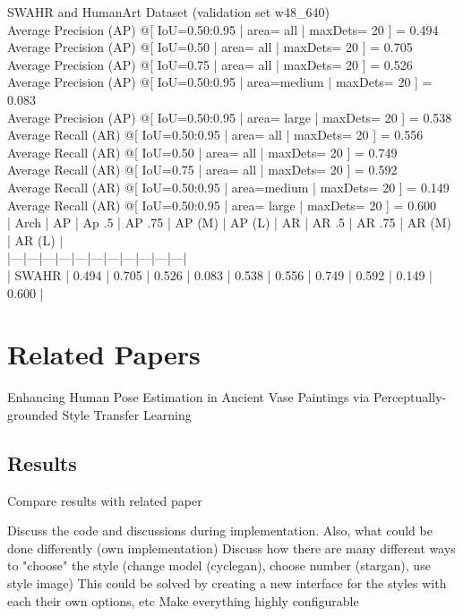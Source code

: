 SWAHR and HumanArt Dataset (validation set w48\_640)\\
Average Precision  (AP) @[ IoU=0.50:0.95 | area=   all | maxDets= 20 ] = 0.494\\
Average Precision  (AP) @[ IoU=0.50      | area=   all | maxDets= 20 ] = 0.705\\
Average Precision  (AP) @[ IoU=0.75      | area=   all | maxDets= 20 ] = 0.526\\
Average Precision  (AP) @[ IoU=0.50:0.95 | area=medium | maxDets= 20 ] = 0.083\\
Average Precision  (AP) @[ IoU=0.50:0.95 | area= large | maxDets= 20 ] = 0.538\\
Average Recall     (AR) @[ IoU=0.50:0.95 | area=   all | maxDets= 20 ] = 0.556\\
Average Recall     (AR) @[ IoU=0.50      | area=   all | maxDets= 20 ] = 0.749\\
Average Recall     (AR) @[ IoU=0.75      | area=   all | maxDets= 20 ] = 0.592\\
Average Recall     (AR) @[ IoU=0.50:0.95 | area=medium | maxDets= 20 ] = 0.149\\
Average Recall     (AR) @[ IoU=0.50:0.95 | area= large | maxDets= 20 ] = 0.600\\
| Arch | AP | Ap .5 | AP .75 | AP (M) | AP (L) | AR | AR .5 | AR .75 | AR (M) | AR (L) |\\
|---|---|---|---|---|---|---|---|---|---|---|\\
| SWAHR | 0.494 | 0.705 | 0.526 | 0.083 | 0.538 | 0.556 | 0.749 | 0.592 | 0.149 | 0.600 |\\

\section{Related Papers}
Enhancing Human Pose Estimation in Ancient Vase Paintings via Perceptually-grounded Style Transfer Learning \cite{Madhu2020}\\
\subsection{Results}
\label{sec:baseline_related_papers_results}
Compare results with related paper

Discuss the code and discussions during implementation.
Also, what could be done differently (own implementation)
Discuss how there are many different ways to "choose" the style (change model (cyclegan), choose number (stargan), use style image)
This could be solved by creating a new interface for the styles with each their own options, etc 
Make everything highly configurable

